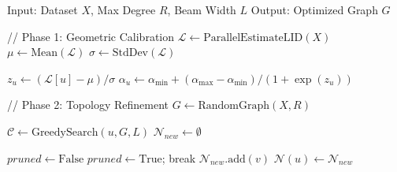 \documentclass{article}
\theoremstyle{plain}
\theoremstyle{definition}
\theoremstyle{remark}
\begin{document}
\begin{algorithm}[h!]
   \caption{Manifold-Consistent Graph Indexing (MCGI)}
   \label{alg:mcgi}
\begin{algorithmic}
   \STATE Input: Dataset $X$, Max Degree $R$, Beam Width $L$
   \STATE Output: Optimized Graph $G$

   \STATE
   \STATE // Phase 1: Geometric Calibration
   \STATE $\mathcal{L} \leftarrow \text{ParallelEstimateLID}(X)$
   \STATE $\mu \leftarrow \text{Mean}(\mathcal{L})$
   \STATE $\sigma \leftarrow \text{StdDev}(\mathcal{L})$

       \STATE $z_u \leftarrow (\mathcal{L}[u] - \mu) / \sigma$
       \STATE $\alpha_u \leftarrow \alpha_{\min} + (\alpha_{\max} - \alpha_{\min}) / (1 + \exp(z_u))$
   \ENDFOR

   \STATE 
   \STATE // Phase 2: Topology Refinement
   \STATE $G \leftarrow \text{RandomGraph}(X, R)$
   
           \STATE $\mathcal{C} \leftarrow \text{GreedySearch}(u, G, L)$
           \STATE $\mathcal{N}_{new} \leftarrow \emptyset$
           
               \STATE $pruned \leftarrow \text{False}$
                       \STATE $pruned \leftarrow \text{True}$; break
                   \ENDIF
               \ENDFOR
                   \STATE $\mathcal{N}_{new}.\text{add}(v)$
               \ENDIF
           \ENDFOR
           \STATE $\mathcal{N}(u) \leftarrow \mathcal{N}_{new}$
       \ENDFOR
   \ENDFOR
\end{algorithmic}
\end{algorithm}
\end{document}
